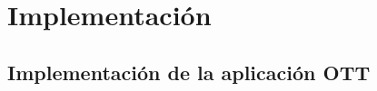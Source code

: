\chapter{Implementación}
\label{sec:implementacion}



\section{Implementación de la aplicación OTT}
